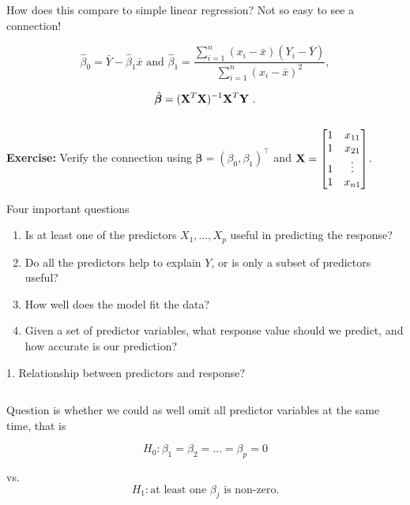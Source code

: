 \documentclass[10pt,ignorenonframetext,]{beamer}
\begin{document}
\begin{frame}

How does this compare to simple linear regression? Not so easy to see a
connection!

\[\hat{\beta}_0 = \bar{Y}-\hat{\beta}_1 \bar{x} \text{ and } \hat{\beta}_1 = \frac{\sum_{i=1}^n(x_i-\bar{x})(Y_i-\bar{Y})}{\sum_{i=1}^n(x_i-\bar{x})^2},\]

\[ \hat{\boldsymbol\beta}=({\bf X}^T{\bf X})^{-1} {\bf X}^T {\bf Y} \ .\]

\(~\)

\textbf{Exercise:} Verify the connection using
\(\boldsymbol\beta=(\beta_0,\beta_1)^\top\) and
\({\bf X}= \left[\begin{matrix} 1 & x_{11} \\ 1 & x_{21} \\ 1 & \vdots \\ 1 & x_{n1} \\ \end{matrix}\right]\).

\end{frame}

\begin{frame}{Four important questions}
\protect\hypertarget{four-important-questions}{}

\begin{enumerate}
\item
  Is at least one of the predictors \(X_1, \ldots, X_p\) useful in
  predicting the response?
\item
  Do all the predictors help to explain \(Y\), or is only a subset of
  predictors useful?
\item
  How well does the model fit the data?
\item
  Given a set of predictor variables, what response value should we
  predict, and how accurate is our prediction?
\end{enumerate}

\end{frame}

\begin{frame}

\begin{block}{1. Relationship between predictors and response?}

\(~\)

Question is whether we could as well omit all predictor variables at the
same time, that is

\begin{center}
$$H_0: \beta_1=\beta_2=\ldots=\beta_p=0 $$

vs. 
$$H_1: \text{at least one } \beta_j \text{ is non-zero.}$$
\end{center}

\end{block}

\end{frame}
\end{document}
